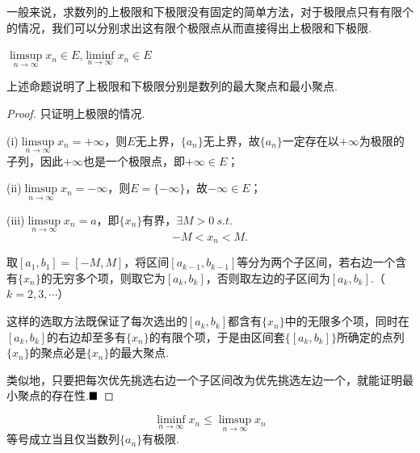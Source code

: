 一般来说，求数列的上极限和下极限没有固定的简单方法，对于极限点只有有限个的情况，我们可以分别求出这有限个极限点从而直接得出上极限和下极限.
\begin{proposition}
	$\limsup\limits_{n\to\infty}x_n\in E$,$\liminf\limits_{n\to\infty}x_n\in E$
\end{proposition}
上述命题说明了上极限和下极限分别是数列的最大聚点和最小聚点.
\begin{proof}
	只证明上极限的情况.
	
	(i)$\limsup\limits_{n\to\infty}x_n=+\infty$，则$E$无上界，$\{a_n\}$无上界，故$\{a_n\}$一定存在以$+\infty$为极限的子列，因此$+\infty$也是一个极限点，即$+\infty\in E$；
	
	(ii)$\limsup\limits_{n\to\infty}x_n=-\infty$，则$E=\{-\infty\}$，故$-\infty\in E$；
	
	(iii)$\limsup\limits_{n\to\infty}x_n=a$，即$\{x_n\}$有界，$\exists M>0\ s.t.\ $
	$$-M<x_n<M.$$
	
	取$\left[a_1,b_1\right]=\left[-M,M\right]$，将区间$\left[a_{k-1},b_{k-1}\right]$等分为两个子区间，若右边一个含有$\{x_n\}$的无穷多个项，则取它为$\left[a_k,b_k\right]$，否则取左边的子区间为$\left[a_k,b_k\right]$.（$k=2,3,\cdots$）
	
	这样的选取方法既保证了每次选出的$\left[a_k,b_k\right]$都含有$\{x_n\}$中的无限多个项，同时在$\left[a_k,b_k\right]$的右边却至多有$\{x_n\}$的有限个项，于是由区间套$\{\left[a_k,b_k\right]\}$所确定的点列$\{x_n\}$的聚点必是$\{x_n\}$的最大聚点.
	
	类似地，只要把每次优先挑选右边一个子区间改为优先挑选左边一个，就能证明最小聚点的存在性.$\hfill\blacksquare$
\end{proof}
\begin{theorem}
	$$\liminf\limits_{n\to\infty}x_n\leqslant\limsup\limits_{n\to\infty}x_n$$
	等号成立当且仅当数列$\{a_n\}$有极限.	
\end{theorem}

